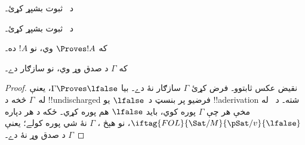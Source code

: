 \documentclass[../../../include/open-logic-section]{subfiles}
\begin{document}
\begin{prob}
د~ ثبوت بشپړ کړئ۔
\end{prob}
\tagendprob

\begin{prob}
د~ ثبوت بشپړ کړئ۔
\end{prob}
\tagendprob

\begin{cor}
که $\Proves !A$ وي، نو $!A$  ده۔
\end{cor}

\begin{cor}
که $\Gamma$ د صدق وړ وي، نو سازګار دے۔
\end{cor}

\begin{proof}
نقيض عکس ثابتوو۔ فرض کړئ $\Gamma$ سازګار نۀ دے۔ بيا
$\Gamma \Proves \lfalse$، يعنې له~$\Gamma$ څخه د
!!{undischarged} فرضيو پر بنسټ د~$\lfalse$ يو !!a{derivation} شته۔
د~ له مخې هر
چې $\Gamma$ پوره کوي، بايد $\lfalse$ هم پوره کړي۔ ځکه د هر
دپاره $\iftag{FOL}{\Sat/{M}}{\pSat/{v}}{\lfalse}$، نو هېڅ
، $\Gamma$ نۀ شي پوره
کولے؛ يعنې $\Gamma$ د صدق وړ نۀ دے۔
\end{proof}
\end{document}
